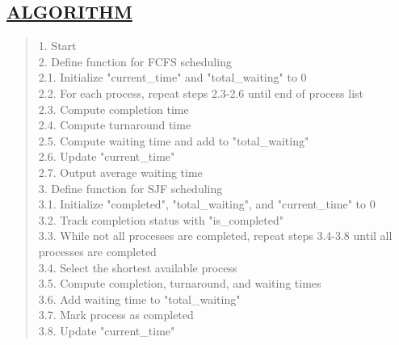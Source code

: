 \documentclass[a4paper, 12pt]{article}
\begin{document}
\subsection*{\underline{ALGORITHM}}
\begin{quote}
1. Start\\
2. Define function for FCFS scheduling\\
\hspace*{1cm} 2.1. Initialize "current\_time" and "total\_waiting" to 0\\
\hspace*{1cm} 2.2. For each process, repeat steps 2.3-2.6 until end of process list\\
\hspace*{1cm} 2.3. Compute completion time\\
\hspace*{1cm} 2.4. Compute turnaround time\\
\hspace*{1cm} 2.5. Compute waiting time and add to "total\_waiting"\\
\hspace*{1cm} 2.6. Update "current\_time"\\
\hspace*{1cm} 2.7. Output average waiting time\\
3. Define function for SJF scheduling\\
\hspace*{1cm} 3.1. Initialize "completed", "total\_waiting", and "current\_time" to 0\\
\hspace*{1cm} 3.2. Track completion status with "is\_completed"\\
\hspace*{1cm} 3.3. While not all processes are completed, repeat steps 3.4-3.8 until all processes are completed\\
\hspace*{1cm} 3.4. Select the shortest available process\\
\hspace*{1cm} 3.5. Compute completion, turnaround, and waiting times\\
\hspace*{1cm} 3.6. Add waiting time to "total\_waiting"\\
\hspace*{1cm} 3.7. Mark process as completed\\
\hspace*{1cm} 3.8. Update "current\_time"\\

\end{quote}
\end{document}
